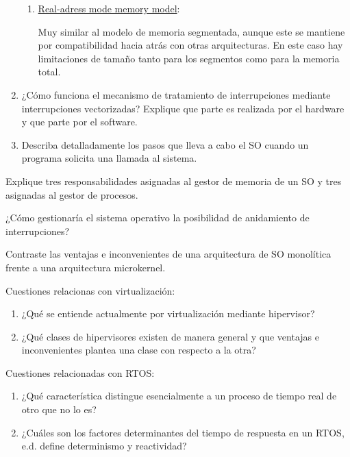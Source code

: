 \begin{ejercicio}
\begin{enumerate}
\begin{enumerate}
            \item \ul{Real-adress mode memory model}: 

            Muy similar al modelo de memoria segmentada, aunque este se mantiene por compatibilidad hacia atrás con otras arquitecturas. En este caso hay limitaciones de tamaño tanto para los segmentos como para la memoria total.
        \end{enumerate}

        \item ¿Cómo funciona el mecanismo de tratamiento de interrupciones mediante interrupciones vectorizadas? Explique que parte es realizada por el hardware y que parte por el software.
        
        \item Describa detalladamente los pasos que lleva a cabo el SO cuando un programa solicita una llamada al sistema.
    \end{enumerate}
\end{ejercicio}

\begin{ejercicio}
    Explique tres responsabilidades asignadas al gestor de memoria de un SO y tres asignadas al gestor de procesos.
\end{ejercicio}

\begin{ejercicio}
    ¿Cómo gestionaría el sistema operativo la posibilidad de anidamiento de interrupciones?
\end{ejercicio}

\begin{ejercicio}
    Contraste las ventajas e inconvenientes de una arquitectura de SO monolítica frente a una arquitectura microkernel.
\end{ejercicio}

\begin{ejercicio}
    Cuestiones relacionas con virtualización:
    \begin{enumerate}
        \item ¿Qué se entiende actualmente por virtualización mediante hipervisor?
        
        \item ¿Qué clases de hipervisores existen de manera general y que ventajas e inconvenientes plantea una clase con respecto a la otra?
    \end{enumerate}
\end{ejercicio}

\begin{ejercicio}
    Cuestiones relacionadas con RTOS:
    \begin{enumerate}
        \item ¿Qué característica distingue esencialmente a un proceso de tiempo real de otro que no lo es?

        \item ¿Cuáles son los factores determinantes del tiempo de respuesta en un RTOS, e.d. define determinismo y reactividad?
    \end{enumerate}
\end{ejercicio}